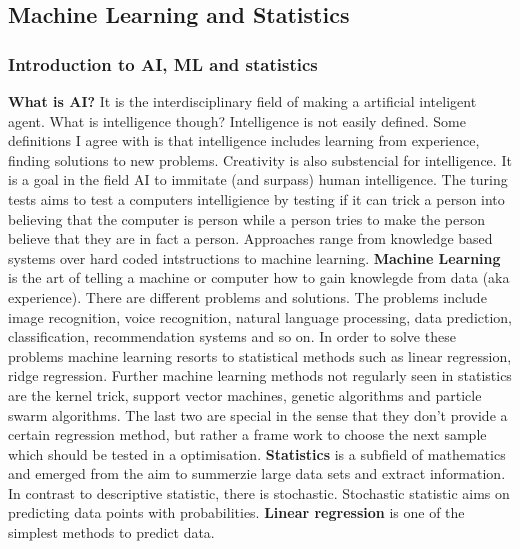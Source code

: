 \subsection{Machine Learning and Statistics}

\subsubsection{Introduction to AI, ML and statistics}
\textbf{What is AI?} It is the interdisciplinary field of making a artificial inteligent agent. 
What is intelligence though?
Intelligence is not easily defined. Some definitions I agree with is that intelligence 
includes learning from experience, finding solutions to new problems. 
Creativity is also substencial for intelligence. 
It is a goal in the field AI to immitate (and surpass) human intelligence. 
The turing tests aims to test a computers intelligience by testing if it can trick a person into believing that the computer is person while a person tries to make the person believe that they are in fact a person. 
Approaches range from knowledge based systems over hard coded intstructions to machine learning. 
%
\textbf{Machine Learning} is the art of telling a machine or computer how to gain knowlegde from data (aka experience). 
There are different problems and solutions. 
The problems include image recognition, voice recognition, natural language processing, data prediction, classification, recommendation systems and so on. 
%
In order to solve these problems machine learning resorts to statistical methods such as
linear regression, ridge regression. 
Further machine learning methods not regularly seen in statistics are the 
kernel trick, support vector machines, genetic algorithms and particle swarm algorithms. 
The last two are special in the sense that they don't provide a certain regression method,
but rather a frame work to choose the next sample which should be tested in a optimisation. 
%
\textbf{Statistics} is a subfield of mathematics and emerged from the aim to summerzie large data sets 
and extract information. In contrast to descriptive statistic, there is stochastic. 
Stochastic statistic aims on predicting data points with probabilities. 
%
\textbf{Linear regression} is one of the simplest methods to predict data. 
